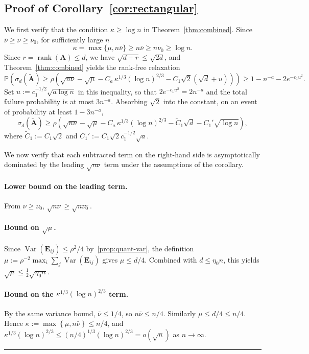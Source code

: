\documentclass{article}
\newcommand{\Var}{\operatorname{Var}}   %
\newcommand{\pr}[1]{\mbox{}\mathbb{P}\left(#1\right)}
\newcommand{\Ab}{\mathbf{A}}
\newcommand{\Eb}{\mathbf{E}}
\newcommand{\Abtil}{\tilde{\Ab}}
\newcommand{\BlackBox}{\rule{1.5ex}{1.5ex}}  %
\newenvironment{proof}{\par\noindent{\bf Proof\ }}{\hfill\BlackBox\par\medskip}
\newcommand{\rank}{\mathop{\mathrm{rank}}}
\newcommand{\rbr}[1]{\left(#1\right)}
\newcommand{\cbr}[1]{\left\{#1\right\}}
\begin{document}
\subsection{Proof of Corollary~\ref{cor:rectangular}}\label{app:rectangular}

\begin{proof}
We first verify that the condition $\kappa\ge \log n$ in
Theorem~\ref{thm:combined}.
Since $\bar\nu\ge\nu\ge\nu_0$, for sufficiently large $n$
\[
    \kappa=\max\{\mu,n\bar\nu\}\ge n\bar\nu\ge n\nu_0\ge \log n.
\]
Since $r = \rank(\Ab) \le d$, we have $\sqrt{d+r} \le \sqrt{2d}$, and Theorem~\ref{thm:combined} yields the rank-free relaxation
\begin{equation*}
    \pr{\sigma_d(\Abtil) \ge \rho\rbr{\sqrt{n\nu} - \sqrt{\mu} - C_a\,\kappa^{1/3}(\log n)^{2/3} - C_1\sqrt{2}\rbr{\sqrt{d}+u}}} \ge 1 - n^{-a} - 2 e^{-c_1 u^2}.
\end{equation*}
Set $u := c_1^{-1/2}\sqrt{a\log n}$ in this inequality, so that $2 e^{-c_1 u^2} = 2 n^{-a}$ and the total failure probability is at most $3 n^{-a}$. Absorbing $\sqrt{2}$ into the constant, on an event of probability at least $1 - 3n^{-a}$,
\begin{equation}\label{eq:rect-step1}
    \sigma_d(\Abtil) \ge \rho\rbr{\sqrt{n\nu} - \sqrt{\mu} - C_a\,\kappa^{1/3}(\log n)^{2/3} - \widetilde{C}_1\sqrt{d} - C_1'\sqrt{\log n}},
\end{equation}
where $\widetilde{C}_1 := C_1 \sqrt{2}$ and $C_1' := C_1 \sqrt{2} c_1^{-1/2}\sqrt{a}$.

We now verify that each subtracted term on the right-hand side is asymptotically dominated by the leading $\sqrt{n\nu}$ term under the assumptions of the corollary.

\paragraph{Lower bound on the leading term.} From $\nu \ge \nu_0$, $\sqrt{n\nu} \ge \sqrt{n\nu_0}$.

\paragraph{Bound on $\sqrt{\mu}$.} Since $\Var(\Eb_{ij}) \le \rho^2/4$ by~\eqref{prop:quant-var}, the definition $\mu := \rho^{-2}\max_i \sum_j \Var(\Eb_{ij})$ gives $\mu \le d/4$. Combined with $d \le \eta_0 n$, this yields $\sqrt{\mu} \le \tfrac{1}{2}\sqrt{\eta_0 n}$.

\paragraph{Bound on the $\kappa^{1/3}(\log n)^{2/3}$ term.} By the same variance bound, $\bar\nu \le 1/4$, so $n\bar\nu \le n/4$. Similarly $\mu \le d/4 \le n/4$. Hence $\kappa := \max\cbr{\mu, n\bar\nu} \le n/4$, and $\kappa^{1/3}(\log n)^{2/3} \le (n/4)^{1/3}(\log n)^{2/3} = o(\sqrt{n})$ as $n \to \infty$.


\end{proof}
\end{document}
